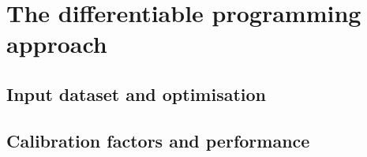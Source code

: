 \begin{figure}
    \centering
    \hspace{1cm}
    \caption{}
    \label{fig:NN_HyperParameters}
\end{figure}

\newpage

\section{The differentiable programming approach} %
\subsection{Input dataset and optimisation} %


\subsection{Calibration factors and performance} %

